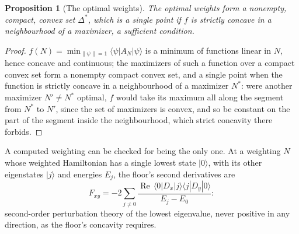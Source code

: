 \documentclass[aps,prd,reprint,superscriptaddress]{revtex4-2}
\newtheorem{proposition}{Proposition}
\begin{document}
\begin{proposition}[The optimal weights]\label{prop:weights}
The optimal weights form a nonempty, compact, convex set $\Delta^*$, which is a single point if $f$ is strictly concave in a neighbourhood of a maximizer, a sufficient condition.
\end{proposition}
\begin{proof}
$f(N) = \min_{\|\psi\| = 1}\langle\psi|A_N|\psi\rangle$ is a minimum of functions linear in $N$, hence concave and continuous; the maximizers of such a function over a compact convex set form a nonempty compact convex set, and a single point when the function is strictly concave in a neighbourhood of a maximizer $N^*$: were another maximizer $N' \neq N^*$ optimal, $f$ would take its maximum all along the segment from $N^*$ to $N'$, since the set of maximizers is convex, and so be constant on the part of the segment inside the neighbourhood, which strict concavity there forbids.
\end{proof}

A computed weighting can be checked for being the only one. At a weighting $N$ whose weighted Hamiltonian has a single lowest state $|0\rangle$, with its other eigenstates $|j\rangle$ and energies $E_j$, the floor's second derivatives are
\begin{equation}
  F_{xy} = -2 \sum_{j \neq 0} \frac{\operatorname{Re}\,\langle 0|D_x|j\rangle\langle j|D_y|0\rangle}{E_j - E_0} :
  \label{eq:curvature}
\end{equation}
second-order perturbation theory of the lowest eigenvalue, never positive in any direction, as the floor's concavity requires.
\end{document}
